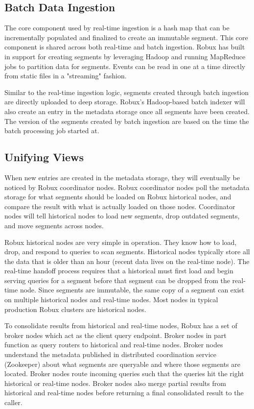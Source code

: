 \documentclass{vldb}
\begin{document}
\subsection{Batch Data Ingestion}
The core component used by real-time ingestion is a hash map that can be
incrementally populated and finalized to create an immutable segment. This core
component is shared across both real-time and batch ingestion. Robux has built
in support for creating segments by leveraging Hadoop and running MapReduce
jobs to partition data for segments.  Events can be read in one at a time
directly from static files in a "streaming" fashion.

Similar to the real-time ingestion logic, segments created through batch
ingestion are directly uploaded to deep storage. Robux’s Hadoop-based batch
indexer will also create an entry in the metadata storage once all segments
have been created. The version of the segments created by batch ingestion are
based on the time the batch processing job started at.

\subsection{Unifying Views}
When new entries are created in the metadata storage, they will eventually be
noticed by Robux coordinator nodes. Robux coordinator nodes poll the metadata
storage for what segments should be loaded on Robux historical nodes, and
compare the result with what is actually loaded on those nodes. Coordinator
nodes will tell historical nodes to load new segments, drop outdated segments,
and move segments across nodes.

Robux historical nodes are very simple in operation. They know how to load,
drop, and respond to queries to scan segments. Historical nodes typically
store all the data that is older than an hour (recent data lives on the
real-time node). The real-time handoff process requires that a historical must
first load and begin serving queries for a segment before that segment can
be dropped from the real-time node. Since segments are immutable, the same copy
of a segment can exist on multiple historical nodes and real-time nodes. Most
nodes in typical production Robux clusters are historical nodes.

To consolidate results from historical and real-time nodes, Robux has a set of
broker nodes which act as the client query endpoint. Broker nodes in part
function as query routers to historical and real-time nodes. Broker nodes
understand the metadata published in distributed coordination service
(Zookeeper) about what segments are queryable and where those segments are
located. Broker nodes route incoming queries such that the queries hit the
right historical or real-time nodes.  Broker nodes also merge partial results
from historical and real-time nodes before returning a final consolidated
result to the caller.
\end{document}
